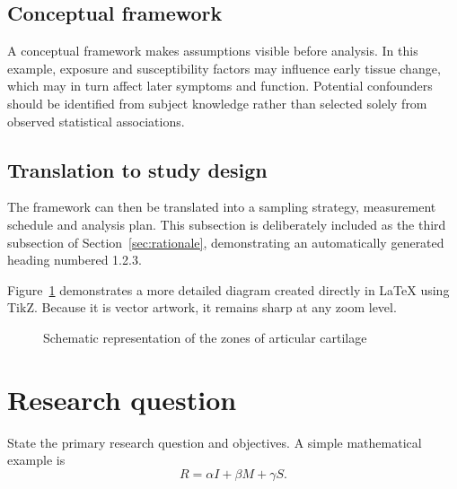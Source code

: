 \subsection{Conceptual framework}
A conceptual framework makes assumptions visible before analysis. In this
example, exposure and susceptibility factors may influence early tissue change,
which may in turn affect later symptoms and function. Potential confounders
should be identified from subject knowledge rather than selected solely from
observed statistical associations.

\subsection{Translation to study design}
The framework can then be translated into a sampling strategy, measurement
schedule and analysis plan. This subsection is deliberately included as the
third subsection of Section~\ref{sec:rationale}, demonstrating an automatically
generated heading numbered 1.2.3.

Figure~\ref{fig:joint-model} demonstrates a more detailed diagram created
directly in LaTeX using TikZ. Because it is vector artwork, it remains sharp at
any zoom level.

\begin{figure}[htbp]
  \centering
  \caption{Schematic representation of the zones of articular cartilage}
  \label{fig:joint-model}
\end{figure}

\section{Research question}
State the primary research question and objectives. A simple mathematical
example is
\begin{equation}
  R = \alpha I + \beta M + \gamma S.
  \label{eq:risk}
\end{equation}

